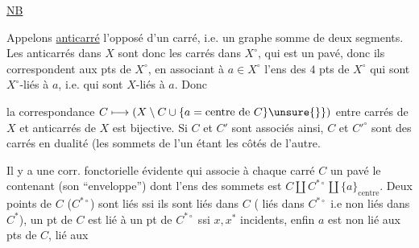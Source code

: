 
\uline{NB} 

Appelons \uline{anticarré} l'opposé d'un carré, i.e. un graphe somme de deux segments. Les anticarrés dans $X$ sont donc les carrés dans $X^\circ$, qui est un pavé, donc ils correspondent aux pts de $X^\circ$, en associant à  $a\in X^\circ$ l'ens des $4$ pts de $X^\circ$ qui sont $X^\circ$-liés à $a$, i.e. qui sont $X$-liés à $a$.  Donc

la correspondance $C\longmapsto(X\setminus C\cup\{a=\text{centre de }C\}\unsure{\}})$ entre carrés de $X$ et anticarrés de $X$ est bijective. Si $C$ et $C'$ sont associés ainsi, $C$ et $C'^\circ$ sont des carrés en dualité (les sommets de l'un étant les côtés de l'autre.

Il y a une corr. fonctorielle évidente qui associe à chaque carré $C$ un pavé  le contenant (son ``enveloppe'') dont l'ens des sommets est $C\amalg C^{*\circ}\amalg\{a\}_{\text{centre}}$. Deux points de $C$ ($C^{*\circ}$) sont liés ssi ils sont liés dans $C$ ( liés dans $C^{*\circ}$ i.e non liés dans $C^*$), un pt  de $C$ est lié à un pt  de $C^{*\circ}$ ssi  $x,x^*$ incidents, enfin $a$ est non lié aux pts de $C$, lié aux

